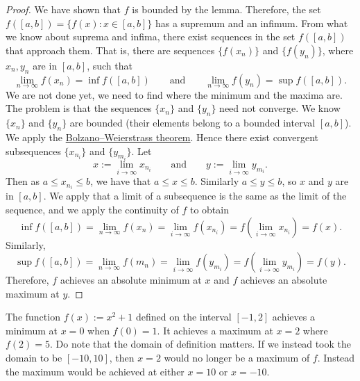 \documentclass[12pt]{book}
\begin{document}
\begin{proof}
We have shown that $f$ is bounded by the lemma.
Therefore, the
set $f([a,b]) = \{ f(x) : x \in [a,b] \}$ has a supremum and an infimum.
From what we know about suprema and infima, there exist sequences
in the set $f([a,b])$ that approach them.
That is, there are sequences
$\{ f(x_n) \}$ and $\{ f(y_n) \}$, where $x_n, y_n$ are in $[a,b]$,
such that
\begin{equation*}
\lim_{n\to\infty} f(x_n) = \inf f([a,b]) \qquad \text{and} \qquad
\lim_{n\to\infty} f(y_n) = \sup f([a,b]).
\end{equation*}
We are not done yet, we need to find where the minimum and the maxima are.
The problem is that the sequences $\{ x_n \}$ and $\{ y_n \}$ need not
converge.
We know $\{ x_n \}$ and $\{ y_n \}$ are bounded (their elements
belong to 
a bounded interval $[a,b]$).
We apply the 
\hyperref[thm:bwseq]{Bolzano--Weierstrass theorem}.
Hence there exist convergent subsequences
$\{ x_{n_i} \}$ and 
$\{ y_{m_i} \}$.
Let
\begin{equation*}
x := \lim_{i\to\infty} x_{n_i}
\qquad \text{and} \qquad
y := \lim_{i\to\infty} y_{m_i}.
\end{equation*}
Then as $a \leq x_{n_i} \leq b$, we have that $a \leq x \leq b$.
Similarly $a \leq y \leq b$, so $x$ and $y$ are in $[a,b]$.
We apply that a limit of a subsequence is the same as the limit of the
sequence, and we apply the continuity of $f$ to obtain
\begin{equation*}
\inf f([a,b]) = \lim_{n\to\infty} f(x_n)
= \lim_{i\to\infty} f(x_{n_i}) = 
f \left( \lim_{i\to\infty} x_{n_i} \right) = f(x) .
\end{equation*}
Similarly,
\begin{equation*}
\sup f([a,b]) = \lim_{n\to\infty} f(m_n)
= \lim_{i\to\infty} f(y_{m_i}) = 
f \left( \lim_{i\to\infty} y_{m_i} \right) = f(y) .
\end{equation*}
Therefore, $f$ achieves an absolute minimum at $x$ and
$f$ achieves an absolute maximum at $y$.
\end{proof}

\begin{example}
The function $f(x) := x^2+1$ defined on the interval $[-1,2]$ achieves a minimum
at $x=0$ when $f(0) = 1$.
It achieves a maximum at $x=2$ where $f(2) = 5$.
Do note that the domain of definition matters.
If we instead took the domain
to be $[-10,10]$, then $x=2$ would no longer be a maximum of $f$.
Instead
the maximum would be achieved at either $x=10$ or $x=-10$.
\end{example}
\end{document}
